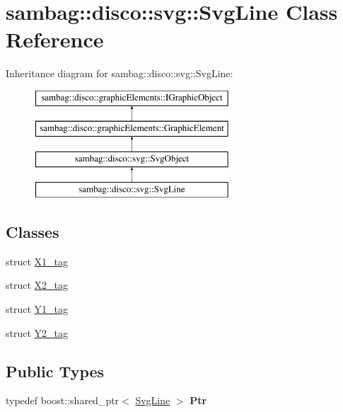 \hypertarget{classsambag_1_1disco_1_1svg_1_1_svg_line}{
\section{sambag::disco::svg::SvgLine Class Reference}
\label{classsambag_1_1disco_1_1svg_1_1_svg_line}
}
Inheritance diagram for sambag::disco::svg::SvgLine:\begin{figure}[H]
\begin{center}
\leavevmode
\includegraphics[height=4.000000cm]{classsambag_1_1disco_1_1svg_1_1_svg_line}
\end{center}
\end{figure}
\subsection*{Classes}
\begin{DoxyCompactItemize}
\item 
struct \hyperlink{structsambag_1_1disco_1_1svg_1_1_svg_line_1_1_x1__tag}{X1\_\-tag}
\item 
struct \hyperlink{structsambag_1_1disco_1_1svg_1_1_svg_line_1_1_x2__tag}{X2\_\-tag}
\item 
struct \hyperlink{structsambag_1_1disco_1_1svg_1_1_svg_line_1_1_y1__tag}{Y1\_\-tag}
\item 
struct \hyperlink{structsambag_1_1disco_1_1svg_1_1_svg_line_1_1_y2__tag}{Y2\_\-tag}
\end{DoxyCompactItemize}
\subsection*{Public Types}
\begin{DoxyCompactItemize}
\item 
\hypertarget{classsambag_1_1disco_1_1svg_1_1_svg_line_a07c0eb7bc6228d7d97dbeac3ae13c7c5}{
typedef boost::shared\_\-ptr$<$ \hyperlink{classsambag_1_1disco_1_1svg_1_1_svg_line}{SvgLine} $>$ {\bfseries Ptr}}
\label{classsambag_1_1disco_1_1svg_1_1_svg_line_a07c0eb7bc6228d7d97dbeac3ae13c7c5}

\end{DoxyCompactItemize}
